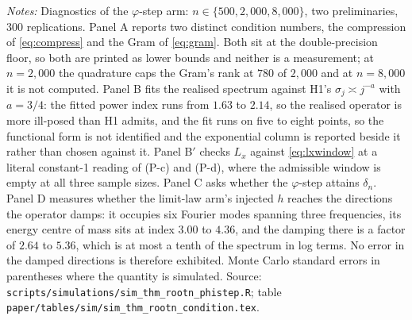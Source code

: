\documentclass[
  12pt]{article}
\newcommand{\1}[1]{\mathds{1}\left[#1\right]}
\theoremstyle{plain}
\theoremstyle{definition}
\theoremstyle{definition}
\theoremstyle{remark}
\begin{document}
\begin{table}[!htbp]
\centering
\begin{threeparttable}
\caption{Conditioning, ill-posedness, and the geometry of the injection}
\label{tab:supp-condition}
\scriptsize
\setlength{\tabcolsep}{3pt}

\begin{tablenotes}\footnotesize
\item \textit{Notes:} Diagnostics of the $\varphi$-step arm: $n\in\{500,2{,}000,
8{,}000\}$, two preliminaries, $300$ replications. Panel A reports two distinct
condition numbers, the compression of \eqref{eq:compress} and the Gram of
\eqref{eq:gram}. Both sit at the double-precision floor, so both are printed as
lower bounds and neither is a measurement; at $n=2{,}000$ the quadrature caps
the Gram's rank at $780$ of $2{,}000$ and at $n=8{,}000$ it is not computed.
Panel B fits the realised spectrum against H1's $\sigma_j\asymp j^{-a}$ with
$a=3/4$: the fitted power index runs from $1.63$ to $2.14$, so the realised
operator is more ill-posed than H1 admits, and the fit runs on five to eight
points, so the functional form is not identified and the exponential column is
reported beside it rather than chosen against it. Panel B$'$ checks $L_x$
against \eqref{eq:lxwindow} at a literal constant-1 reading of (P-c) and (P-d),
where the admissible window is empty at all three sample sizes. Panel C asks
whether the $\varphi$-step attains $\delta_n$. Panel D measures whether the
limit-law arm's injected $h$ reaches the directions the operator damps: it
occupies six Fourier modes spanning three frequencies, its energy centre of mass
sits at index $3.00$ to $4.36$, and the damping there is a factor of $2.64$ to
$5.36$, which is at most a tenth of the spectrum in log terms. No error in the
damped directions is therefore exhibited. Monte Carlo standard errors in
parentheses where the quantity is simulated. Source:
\texttt{scripts/simulations/sim\_thm\_rootn\_phistep.R}; table
\texttt{paper/tables/sim/sim\_thm\_rootn\_condition.tex}.
\end{tablenotes}
\end{threeparttable}
\end{table}
\end{document}
